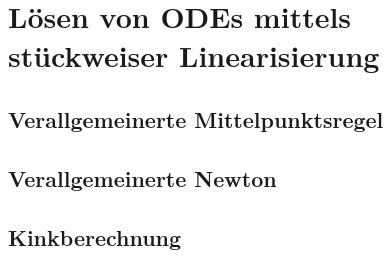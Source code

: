 \chapter{Lösen von ODEs mittels stückweiser Linearisierung}

\section{Verallgemeinerte Mittelpunktsregel}


\section{Verallgemeinerte Newton}

\section{Kinkberechnung}